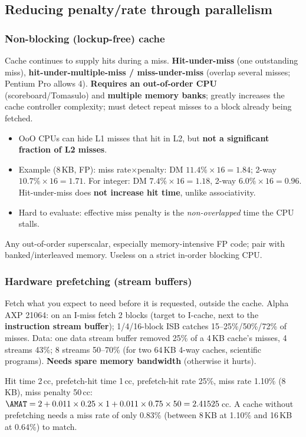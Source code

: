 \subsection{Reducing penalty/rate through parallelism}
\subsubsection{Non-blocking (lockup-free) cache}
Cache continues to supply hits during a miss. \textbf{Hit-under-miss} (one outstanding miss), \textbf{hit-under-multiple-miss / miss-under-miss} (overlap several misses; Pentium Pro allows 4). \textbf{Requires an out-of-order CPU} (scoreboard/Tomasulo) and \textbf{multiple memory banks}; greatly increases the cache controller complexity; must detect repeat misses to a block already being fetched.
\begin{itemize}
\item OoO CPUs can hide L1 misses that hit in L2, but \textbf{not a significant fraction of L2 misses}.
\item Example (8\,KB, FP): miss rate$\times$penalty: DM $11.4\%\times16=1.84$; 2-way $10.7\%\times16=1.71$. For integer: DM $7.4\%\times16=1.18$, 2-way $6.0\%\times16=0.96$. Hit-under-miss does \textbf{not increase hit time}, unlike associativity.
\item Hard to evaluate: effective miss penalty is the \emph{non-overlapped} time the CPU stalls.
\end{itemize}
\begin{pick}
Any out-of-order superscalar, especially memory-intensive FP code; pair with banked/interleaved memory. Useless on a strict in-order blocking CPU.
\end{pick}

\subsubsection{Hardware prefetching (stream buffers)}
Fetch what you expect to need before it is requested, outside the cache. Alpha AXP 21064: on an I-miss fetch 2 blocks (target to I-cache, next to the \textbf{instruction stream buffer}); 1/4/16-block ISB catches 15--25\%/50\%/72\% of misses. Data: one data stream buffer removed 25\% of a 4\,KB cache's misses, 4 streams 43\%; 8 streams 50--70\% (for two 64\,KB 4-way caches, scientific programs). \textbf{Needs spare memory bandwidth} (otherwise it hurts).
\begin{ex}[Slide]
Hit time 2\,cc, prefetch-hit time 1\,cc, prefetch-hit rate 25\%, miss rate 1.10\% (8\,KB), miss penalty 50\,cc:\\
$\AMAT=2+0.011\times0.25\times1+0.011\times0.75\times50=2.41525$\,cc. A cache without prefetching needs a miss rate of only 0.83\% (between 8\,KB at 1.10\% and 16\,KB at 0.64\%) to match.
\end{ex}

